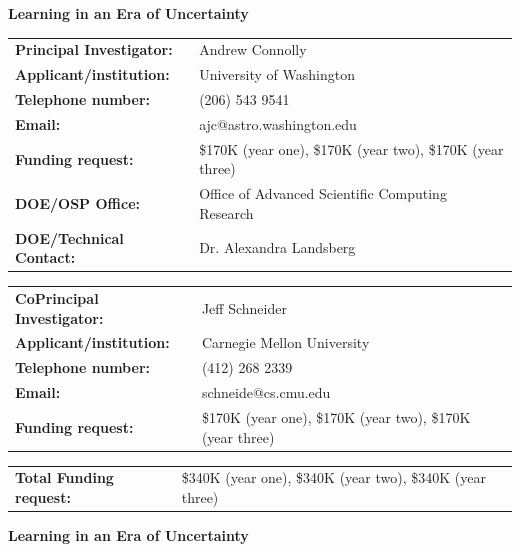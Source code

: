 \documentclass[useAMS,usenatbib,tightenlines,11pt,preprint]{aastex}
\begin{document}
 

\begin{center}
{\bf \Large Learning in an Era of Uncertainty}
\end{center}

\vspace{1cm}

\noindent
\begin{tabular}{ll}
{\bf Principal Investigator: } &Andrew Connolly \\
{\bf Applicant/institution: } & University of Washington\\
{\bf Telephone number: } & (206) 543 9541 \\
{\bf Email: } & ajc@astro.washington.edu \\
{\bf Funding request:} & \$170K (year one), \$170K (year two), \$170K (year
three) \\
{\bf DOE/OSP Office: } & Office of Advanced Scientific Computing Research \\
{\bf DOE/Technical Contact: } & Dr. Alexandra Landsberg 
\end{tabular}

\vspace{1cm}


\noindent \begin{tabular}{ll}
{\bf CoPrincipal Investigator: } & Jeff Schneider \\
{\bf Applicant/institution: } & Carnegie Mellon University \\
{\bf Telephone number: } & (412) 268 2339 \\
{\bf Email: } & schneide@cs.cmu.edu \\
{\bf Funding request:} & \$170K (year one), \$170K (year two), \$170K (year 
three) 
\end{tabular}
 
\vspace{1cm}

\noindent \begin{tabular}{ll}
{\bf Total Funding request:} & \$340K (year one), \$340K (year two), \$340K
(year  three)
\end{tabular}


\newpage

\begin{center}
{\bf \Large Learning in an Era of Uncertainty}
\end{center}
\end{document}
